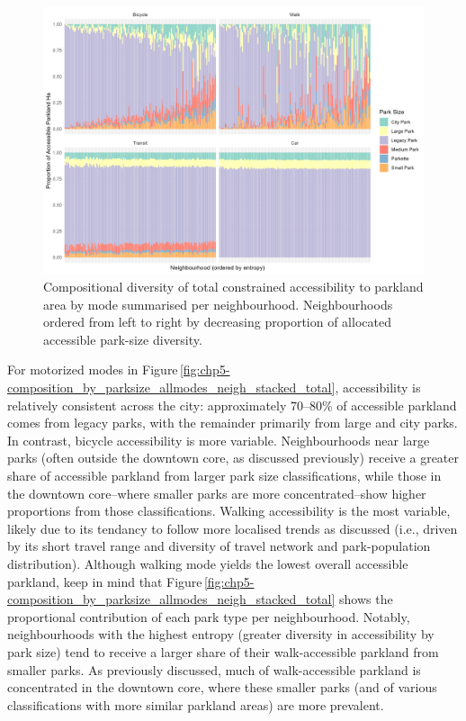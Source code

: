 \documentclass[
11pt, %
oneside, %
english, %
singlespacing, %
]{macthesis} %
\begin{document}
\begin{figure}

{\centering \includegraphics[width=6in]{./data/figures/chp5-composition_by_parksize_allmodes_neigh_stacked_total} 

}

\caption{\label{fig:chp5-composition_by_parksize_allmodes_neigh_stacked_total} Compositional diversity of total constrained accessibility to parkland area by mode summarised per neighbourhood. Neighbourhoods ordered from left to right by decreasing proportion of allocated accessible park-size diversity.}\label{fig:unnamed-chunk-86}
\end{figure}

For motorized modes in Figure\,\ref{fig:chp5-composition_by_parksize_allmodes_neigh_stacked_total}, accessibility is relatively consistent across the city: approximately 70--80\% of accessible parkland comes from legacy parks, with the remainder primarily from large and city parks. In contrast, bicycle accessibility is more variable. Neighbourhoods near large parks (often outside the downtown core, as discussed previously) receive a greater share of accessible parkland from larger park size classifications, while those in the downtown core--where smaller parks are more concentrated--show higher proportions from those classifications. Walking accessibility is the most variable, likely due to its tendancy to follow more localised trends as discussed (i.e., driven by its short travel range and diversity of travel network and park-population distribution). Although walking mode yields the lowest overall accessible parkland, keep in mind that Figure\,\ref{fig:chp5-composition_by_parksize_allmodes_neigh_stacked_total} shows the proportional contribution of each park type per neighbourhood. Notably, neighbourhoods with the highest entropy (greater diversity in accessibility by park size) tend to receive a larger share of their walk-accessible parkland from smaller parks. As previously discussed, much of walk-accessible parkland is concentrated in the downtown core, where these smaller parks (and of various classifications with more similar parkland areas) are more prevalent.
\end{document}
